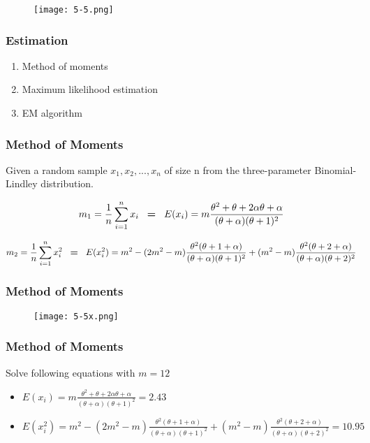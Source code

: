 \documentclass{beamer}
\begin{document}
\begin{frame}
\begin{figure}
\centering
\texttt{[image: 5-5.png]}
\end{figure}
\end{frame}

\begin{frame}
\frametitle{Estimation}
\begin{enumerate}
      \item  Method of moments
      \bigskip
      \item Maximum likelihood estimation
      \bigskip
      \item  EM algorithm
\end{enumerate}
\end{frame}

\begin{frame}
\frametitle{Method of Moments}
Given a random sample $x_{1}, x_{2}, ..., x_{n}$ of size n from the three-parameter Binomial-Lindley distribution.

\footnotesize
\[m_{1}=\frac{1}{n} \sum_{i=1}^n x_{i} \hspace{3mm} \textbf{=} \hspace{3mm} E(x_{i})=m\frac{\theta^2+\theta+2\alpha\theta+\alpha}{(\theta+\alpha)(\theta+1)^2}\] 

\[m_{2}=\frac{1}{n} \sum_{i=1}^n x_{i}^2 \hspace{3mm} \textbf{=} \hspace{3mm} E(x_{i}^2)=m^2 - (2m^2-m) \frac{\theta^2(\theta+1+\alpha)}{(\theta+\alpha)(\theta+1)^2}+ (m^2-m)\frac{\theta^2(\theta+2+\alpha)}{(\theta+\alpha)(\theta+2)^2}\]
\end{frame}

\begin{frame}
\frametitle{Method of Moments}
\begin{figure}
\centering
\texttt{[image: 5-5x.png]}
\end{figure}
\end{frame}

\begin{frame}
\frametitle{Method of Moments}
\small
Solve following equations with $m=12$

\bigskip
\begin{itemize}
\item $E(x_{i})=m\frac{\theta^2+\theta+2\alpha\theta+\alpha}{(\theta+\alpha)(\theta+1)^2}=2.43$

\bigskip
\item $E(x_{i}^2)= m^2 - (2m^2-m) \frac{\theta^2(\theta+1+\alpha)}{(\theta+\alpha)(\theta+1)^2}+ (m^2-m)\frac{\theta^2(\theta+2+\alpha)}{(\theta+\alpha)(\theta+2)^2}=10.95$
\end{itemize}
\end{frame}
\end{document}
